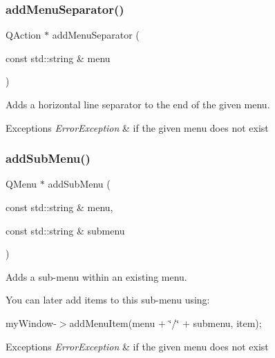\subsubsection{\texorpdfstring{add\+Menu\+Separator()}{addMenuSeparator()}}
{\footnotesize\ttfamily Q\+Action $\ast$ add\+Menu\+Separator (\begin{DoxyParamCaption}\item[{const std\+::string \&}]{menu }\end{DoxyParamCaption})\hspace{0.3cm}{\ttfamily [virtual]}}



Adds a horizontal line separator to the end of the given menu. 


\begin{DoxyExceptions}{Exceptions}
{\em Error\+Exception} & if the given menu does not exist \\
\hline
\end{DoxyExceptions}
\mbox{\label{classGWindow_a557f7b2372831420546b73239027d2ae}} 
\subsubsection{\texorpdfstring{add\+Sub\+Menu()}{addSubMenu()}}
{\footnotesize\ttfamily Q\+Menu $\ast$ add\+Sub\+Menu (\begin{DoxyParamCaption}\item[{const std\+::string \&}]{menu,  }\item[{const std\+::string \&}]{submenu }\end{DoxyParamCaption})\hspace{0.3cm}{\ttfamily [virtual]}}



Adds a sub-\/menu within an existing menu. 

You can later add items to this sub-\/menu using\+:

my\+Window-\/$>$add\+Menu\+Item(menu + \char`\"{}/\char`\"{} + submenu, item); 
\begin{DoxyExceptions}{Exceptions}
{\em Error\+Exception} & if the given menu does not exist \\
\hline
\end{DoxyExceptions}
\mbox{\label{classGWindow_ab523bda15e486bc3c968059c8b23a8d9}} 
